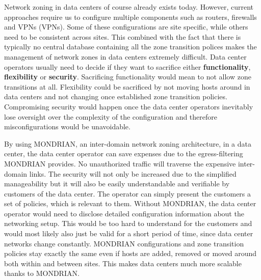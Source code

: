 Network zoning in data centers of course already exists today. However, current approaches require us to configure multiple components such as routers, firewalls and \acsp{VPN} (\aclp{VPN}). Some of these configurations are site specific, while others need to be consistent across sites. This combined with the fact that there is typically no central database containing all the zone transition polices makes the management of network zones in data centers extremely difficult. %
Data center operators usually need to decide if they want to sacrifice either \textbf{functionality}, \textbf{flexibility} or \textbf{security}. Sacrificing functionality would mean to not allow zone transitions at all. Flexibility could be sacrificed by not moving hosts around in data centers and not changing once established zone transition policies. Compromising security would happen once the data center operators inevitably lose oversight over the complexity of the configuration and therefore misconfigurations would be unavoidable.

By using MONDRIAN, an inter-domain network zoning architecture, in a data center, the data center operator can save expenses due to the egress-filtering MONDRIAN provides. No unauthorized traffic will traverse the expensive inter-domain links. The security will not only be increased due to the simplified manageability but it will also be easily understandable and verifiable by customers of the data center. The operator can simply present the customers a set of policies, which is relevant to them. Without MONDRIAN, the data center operator would need to disclose detailed configuration information about the networking setup. This would be too hard to understand for the customers and would most likely also just be valid for a short period of time, since data center networks change constantly. MONDRIAN configurations and zone transition policies stay exactly the same even if hosts are added, removed or moved around both within and between sites. This makes data centers much more scalable thanks to MONDRIAN.

